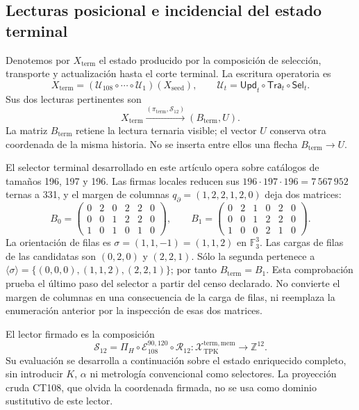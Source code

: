 \subsection{Lecturas posicional e incidencial del estado terminal}
\label{subsec:k-terminal}

Denotemos por \(X_{\mathrm{term}}\) el estado producido por la composición
de selección, transporte y actualización hasta el corte terminal. La
escritura operatoria es
\[
 X_{\mathrm{term}}=
 (\mathcal U_{108}\circ\cdots\circ\mathcal U_1)(X_{\mathrm{seed}}),
 \qquad \mathcal U_t=\mathsf{Upd}_t\circ\mathsf{Tra}_t\circ\mathsf{Sel}_t.
\]
Sus dos lecturas pertinentes son
\[
 X_{\mathrm{term}}
 \xrightarrow{(\pi_{\mathrm{term}},\mathcal S_{12})}
 (B_{\mathrm{term}},U).
\]
La matriz \(B_{\mathrm{term}}\) retiene la lectura ternaria visible; el
vector \(U\) conserva otra coordenada de la misma historia. No se inserta
entre ellos una flecha \(B_{\mathrm{term}}\to U\).

El selector terminal desarrollado en este artículo opera sobre catálogos
de tamaños 196, 197 y 196. Las firmas locales reducen sus
\(196\cdot197\cdot196=7\,567\,952\) ternas a 331, y el margen de
columnas \(q_{\partial}=(1,2,2,1,2,0)\) deja dos matrices:
\[
 B_0=\begin{pmatrix}0&2&0&2&2&0\\0&0&1&2&2&0\\1&0&1&0&1&0\end{pmatrix},
 \qquad
 B_1=\begin{pmatrix}0&2&1&0&2&0\\0&0&1&2&2&0\\1&0&0&2&1&0\end{pmatrix}.
\]
La orientación de filas es \(\sigma=(1,1,-1)=(1,1,2)\) en
\(\mathbb F_3^3\). Las cargas de filas de las candidatas son
\((0,2,0)\) y \((2,2,1)\). Sólo la segunda pertenece a
\(\langle\sigma\rangle=\{(0,0,0),(1,1,2),(2,2,1)\}\); por tanto
\(B_{\mathrm{term}}=B_1\). Esta comprobación prueba el último paso del
selector a partir del censo declarado. No convierte el margen de columnas
en una consecuencia de la carga de filas, ni reemplaza la enumeración
anterior por la inspección de esas dos matrices.

El lector firmado es la composición
\begin{equation}
 \mathcal S_{12}
 =\Pi_H\circ\mathcal E_{108}^{90,120}\circ\mathcal R_{12}:
 \mathcal X_{\mathrm{TPK}}^{\mathrm{term,mem}}
 \longrightarrow\mathbb Z^{12}.
 \label{eq:k-lector-firmado}
\end{equation}
Su evaluación se desarrolla a continuación sobre el estado enriquecido
completo, sin introducir \(K\), \(\alpha\) ni metrología convencional como
selectores. La proyección cruda CT108, que olvida la coordenada firmada, no se
usa como dominio sustitutivo de este lector.

